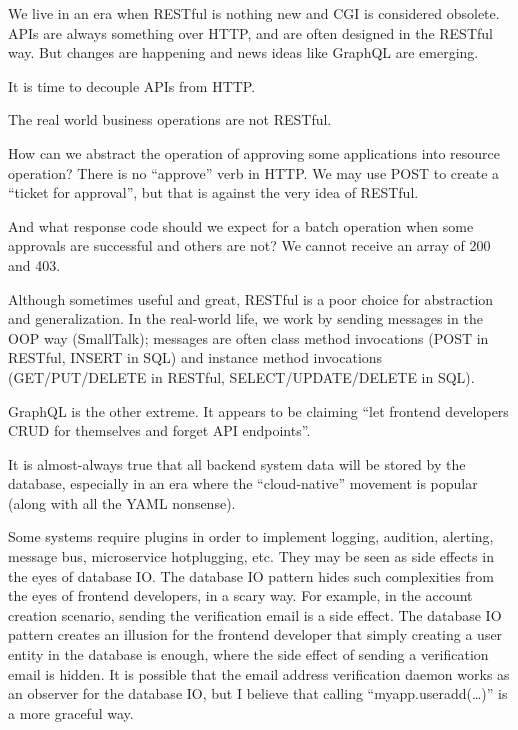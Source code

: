 
We live in an era when RESTful is nothing new and CGI is considered obsolete.
APIs are always something over HTTP, and are often designed in the RESTful way.
But changes are happening and news ideas like GraphQL are emerging.

It is time to decouple APIs from HTTP.

The real world business operations are not RESTful.

How can we abstract the operation of approving some applications into resource operation?
There is no ``approve'' verb in HTTP.
We may use POST to create a ``ticket for approval'',
but that is against the very idea of RESTful.

And what response code should we expect for a batch operation when some approvals are successful and others are not?
We cannot receive an array of 200 and 403.

Although sometimes useful and great, RESTful is a poor choice for abstraction and generalization.
In the real-world life, we work by sending messages in the OOP way (SmallTalk);
messages are often class method invocations (POST in RESTful, INSERT in SQL)
and instance method invocations (GET/PUT/DELETE in RESTful, SELECT/UPDATE/DELETE in SQL).

GraphQL is the other extreme.
It appears to be claiming ``let frontend developers CRUD for themselves and forget API endpoints''.

It is almost-always true that all backend system data will be stored by the database,
especially in an era where the ``cloud-native'' movement is popular (along with all the YAML nonsense).

Some systems require plugins in order to implement
logging, audition, alerting, message bus, microservice hotplugging, etc.
They may be seen as side effects in the eyes of database IO.
The database IO pattern hides such complexities from the eyes of frontend developers, in a scary way.
For example, in the account creation scenario, sending the verification email is a side effect.
The database IO pattern creates an illusion for the frontend developer that
simply creating a user entity in the database is enough,
where the side effect of sending a verification email is hidden.
It is possible that the email address verification daemon works as an observer for the database IO,
but I believe that calling ``myapp.useradd(\ldots)'' is a more graceful way.

